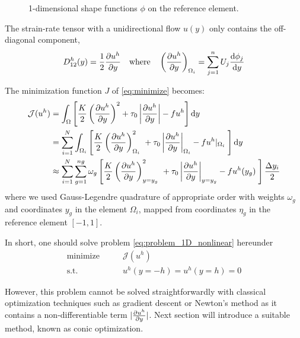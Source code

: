 \documentclass[11 pt]{report}
\begin{document}
\begin{figure}[ht]
    \centering
    
    \caption{1-dimensional shape functions $\phi$ on the reference element.}
    \label{fig:shape_fct_1D}
\end{figure}


The strain-rate tensor with a unidirectional flow $u(y)$ only contains the off-diagonal component,
\begin{equation}
    D_{12}^h(y) = \frac{1}{2} \pdv{u^h}{y} \quad \text{where} \quad \left(\pdv{u^h}{y}\right)_{\Omega_i} = \sum_{j=1}^{n} U_j \dv{\phi_j}{y}
\end{equation}

The minimization function $J$ of \autoref{eq:minimize} becomes:
\begin{equation}
\begin{aligned}
    \mathcal{J}(u^h) &= \int_{\Omega} \left[ \frac{K}{2} \left(\pdv{u^h}{y}\right)^2 + \tau_0 \left|\pdv{u^h}{y}\right| - f u^h \right] \dd y\\
    &= \sum_{i=1}^N \int_{\Omega_i} \left[\frac{K}{2}  \left(\pdv{u^h}{y}\right)^2_{\Omega_i} \ + \tau_0 \left|\pdv{u^h}{y}\right|_{\Omega_i} - f u^h\vert_{\Omega_i} \; \right] \dd y\\
    &\approx \sum_{i=1}^N \sum_{g=1}^{ng} \omega_{g} \left[\frac{K}{2}  \left(\pdv{u^h}{y}\right)^2_{y=y_g} \ + \tau_0 \left|\pdv{u^h}{y}\right|_{y=y_g} - f u^h(y_g) \; \right] \frac{\Delta y_i}{2}
\end{aligned}
\end{equation}
where we used Gauss-Legendre quadrature of appropriate order with weights $\omega_g$ and coordinates $y_g$ in the element $\Omega_i$, mapped from coordinates $\eta_g$ in the reference element $[-1,1]$.

In short, one should solve problem \eqref{eq:problem_1D_nonlinear} hereunder
\begin{equation}
    \begin{aligned}
        \textrm{minimize} \qquad & \mathcal{J}(u^h)\\
        \textrm{s.t.} \qquad & u^h(y=-h) = u^h(y=h) = 0
    \end{aligned}\label{eq:problem_1D_nonlinear}
\end{equation}

However, this problem cannot be solved straightforwardly with classical optimization techniques such as gradient descent or Newton's method as it contains a non-differentiable term $|\pdv{u^h}{y}|$. Next section will introduce a suitable method, known as conic optimization.
\end{document}
